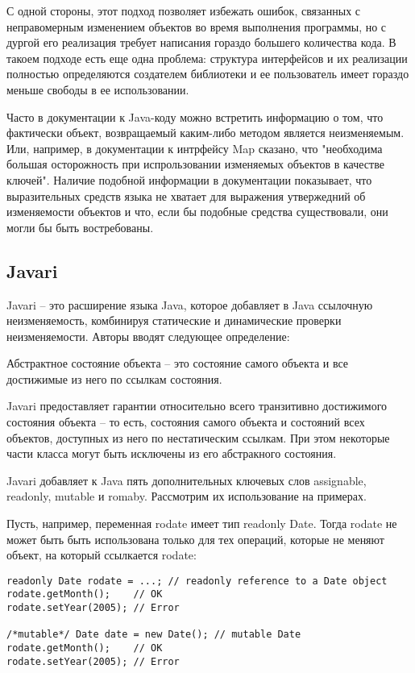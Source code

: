 С одной стороны, этот подход позволяет избежать ошибок, связанных с неправомерным изменением объектов во время выполнения программы, но с дургой его реализация требует написания гораздо большего количества кода. В такоем подходе есть еще одна проблема: структура интерфейсов и их реализации полностью определяются создателем библиотеки и ее пользователь имеет гораздо меньше свободы в ее использовании. 

Часто в документации к Java-коду можно встретить информацию о том, что фактически объект, возвращаемый каким-либо методом является неизменяемым. Или, например, в документации к интрфейсу Map сказано, что "необходима большая осторожность при испрользовании изменяемых объектов в качестве ключей". Наличие подобной информации в документации показывает, что выразительных средств языка не хватает для выражения утвержедний об изменяемости объектов и что, если бы подобные средства существовали, они могли бы быть востребованы.


\subsection{Javari}

Javari -- это расширение языка Java, которое добавляет в Java ссылочную неизменяемость, комбинируя статические и динамические проверки неизменяемости. Авторы вводят следующее определение:

\begin{Def}\label{abstract_state}
Абстрактное состояние объекта -- это состояние самого объекта и все достижимые из него по ссылкам состояния.
\end{Def}

Javari предоставляет гарантии относительно всего транзитивно достижимого состояния объекта -- то есть, состояния самого объекта и состояний всех объектов, доступных из него по нестатическим ссылкам. При этом некоторые части класса могут быть исключены из его абстракного состояния. 

Javari добавляет к Java пять дополнительных ключевых слов assignable, readonly, mutable и romaby. Рассмотрим их использование на примерах.

Пусть, например, переменная rodate имеет тип readonly Date. Тогда rodate не может быть быть использована только для тех операций, которые не меняют объект, на который ссылкается rodate:

\begin{lstlisting}[caption=Неизменяемая ссылка, label=code:readonly_ref]
readonly Date rodate = ...; // readonly reference to a Date object 
rodate.getMonth();    // OK
rodate.setYear(2005); // Error

/*mutable*/ Date date = new Date(); // mutable Date
rodate.getMonth();    // OK
rodate.setYear(2005); // Error
\end{lstlisting}

